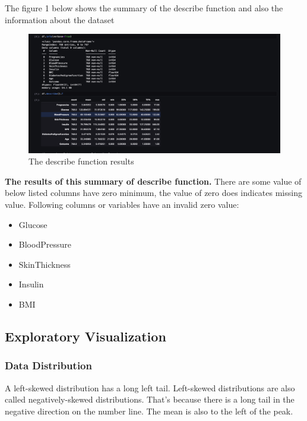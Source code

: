 \documentclass[
]{article}
\providecommand{\tightlist}{%
  \setlength{\itemsep}{0pt}\setlength{\parskip}{0pt}}
\begin{document}
The figure 1 below shows the summary of the describe function and also
the information about the dataset

\begin{figure}
\centering
\includegraphics{describe.png}
\caption{The describe function results}
\end{figure}

\textbf{The results of this summary of describe function.} There are
some value of below listed columns have zero minimum, the value of zero
does indicates missing value. Following columns or variables have an
invalid zero value:

\begin{itemize}
\tightlist
\item
  Glucose
\item
  BloodPressure
\item
  SkinThickness
\item
  Insulin
\item
  BMI
\end{itemize}

\hypertarget{exploratory-visualization}{%
\subsection{Exploratory Visualization}\label{exploratory-visualization}}

\hypertarget{data-distribution}{%
\subsubsection{Data Distribution}\label{data-distribution}}

A left-skewed distribution has a long left tail. Left-skewed
distributions are also called negatively-skewed distributions. That's
because there is a long tail in the negative direction on the number
line. The mean is also to the left of the peak.
\end{document}
